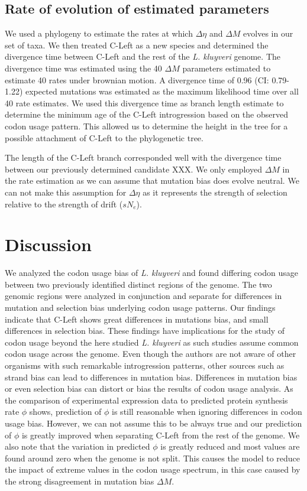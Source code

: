 \documentclass[letter,12pt]{article}
\begin{document}
\subsection*{Rate of evolution of estimated parameters}
We used a phylogeny to estimate the rates at which $\Delta \eta$ and $\Delta M$ evolves in our set of taxa. 
We then treated C-Left as a new species and determined the divergence time between C-Left and the rest of the \textit{L. kluyveri} genome.
The divergence time was estimated using the 40 $\Delta M$ parameters estimated to estimate 40 rates under brownian motion. 
A divergence time of 0.96 (CI: 0.79-1.22) expected mutations was estimated as the maximum likelihood time over all 40 rate estimates.
We used this divergence time as branch length estimate to determine the minimum age of the C-Left introgression based on the observed codon usage pattern.
This allowed us to determine the height in the tree for a possible attachment of C-Left to the phylogenetic tree.

The length of the C-Left branch corresponded well with the divergence time between our previously determined candidate XXX. 
We only employed $\Delta M$ in the rate estimation as we can assume that mutation bias does evolve neutral.
We can not make this assumption for $\Delta \eta$ as it represents the strength of selection relative to the strength of drift ($sN_e$).

\section*{Discussion}

We analyzed the codon usage bias of \textit{L. kluyveri} and found differing codon usage between two previously identified distinct regions of the genome. 
The two genomic regions were analyzed in conjunction and separate for differences in mutation and selection bias underlying codon usage patterns.
Our findings indicate that C-Left shows great differences in mutations bias, and small differences in selection bias.
These findings have implications for the study of codon usage beyond the here studied \textit{L. kluyveri} as such studies assume common codon usage across the genome.
Even though the authors are not aware of other organisms with such remarkable introgression patterns, other sources such as strand bias can lead to differences in mutation bias.
Differences in mutation bias or even selection bias can distort or bias the results of codon usage analysis. 
As the comparison of experimental expression data to predicted protein synthesis rate $\phi$ shows, prediction of $\phi$ is still reasonable when ignoring differences in codon usage bias. 
However, we can not assume this to be always true and our prediction of $\phi$ is greatly improved when separating C-Left from the rest of the genome.
We also note that the variation in predicted $\phi$ is greatly reduced and most values are found around zero when the genome is not split.
This causes the model to reduce the impact of extreme values in the codon usage spectrum, in this case caused by the strong disagreement in mutation bias $\Delta M$.
\end{document}
